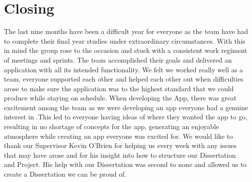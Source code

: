 \section{Closing}
The last nine months have been a difficult year for everyone as the team have had to complete their final year studies under extraordinary circumstances. With this in mind the group rose to the occasion and stuck with a consistent work regiment of meetings and sprints. The team accomplished their goals and delivered an application with all its intended functionality.
\newline
\newline
We felt we worked really well as a team, everyone supported each other and helped each other out when difficulties arose to make sure the application was to the highest standard that we could produce while staying on schedule.
\newline
\newline
When developing the App, there was great excitement among the team as we were developing an app everyone had a genuine interest in .This led to everyone having ideas of where they wanted the app to go, resulting in no shortage of concepts for the app, generating an enjoyable atmosphere while creating an app everyone was excited for.
\newline
\newline
We would like to thank our Supervisor Kevin O'Brien for helping us every week with any issues that may have arose and for his insight into how to structure our Dissertation and Project. His help with our Dissertation was second to none and allowed us to create a Dissertation we can be proud of.

